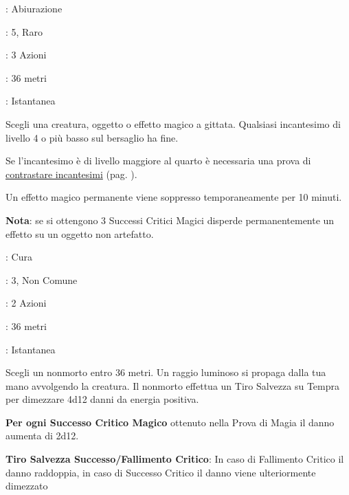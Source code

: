 \begin{multicols}{2}
\hypertarget{dissolvimagieavanzato}{}
\noindent
\begin{description}[noitemsep, topsep=0pt, parsep=0pt, partopsep=0pt, leftmargin=0cm, labelwidth=1.3cm]
	\item[\textbf{Lista}]: Abiurazione
	\item[\textbf{Livello}]: 5, Raro
	\item[\textbf{Lancio}]: 3 Azioni
	\item[\textbf{Gittata}]: 36 metri
	\item[\textbf{Durata}]: Istantanea
\end{description}

Scegli una creatura, oggetto o effetto magico a gittata. Qualsiasi incantesimo di livello 4 o più basso sul bersaglio ha fine.

Se l'incantesimo è di livello maggiore al quarto è necessaria una prova di \hyperlink{contrastareincantesimi}{contrastare incantesimi} (pag. \pageref{contrastareincantesimi}).

Un effetto magico permanente viene soppresso temporaneamente per 10 minuti.

\textbf{Nota}: se si ottengono 3 Successi Critici Magici disperde permanentemente un effetto su un oggetto non artefatto.

\noindent\colorbox{OBSSgold!10}{
\begin{minipage}{0.95\linewidth}
\begin{description}[noitemsep, topsep=0pt, parsep=0pt, partopsep=0pt, leftmargin=0cm, labelwidth=1.3cm]
	\item[\textbf{Lista}]: Cura
	\item[\textbf{Livello}]: 3, Non Comune
	\item[\textbf{Lancio}]: 2 Azioni
	\item[\textbf{Gittata}]: 36 metri
	\item[\textbf{Durata}]: Istantanea
\end{description}
\end{minipage}}\smallskip

Scegli un nonmorto entro 36 metri. Un raggio luminoso si propaga dalla tua mano avvolgendo la creatura. Il nonmorto effettua un Tiro Salvezza su Tempra per dimezzare 4d12 danni da energia positiva.

\textbf{Per ogni Successo Critico Magico} ottenuto nella Prova di Magia il danno aumenta di 2d12.

\textbf{Tiro Salvezza Successo/Fallimento Critico}: In caso di Fallimento Critico il danno raddoppia, in caso di Successo Critico il danno viene ulteriormente dimezzato


\end{multicols}
